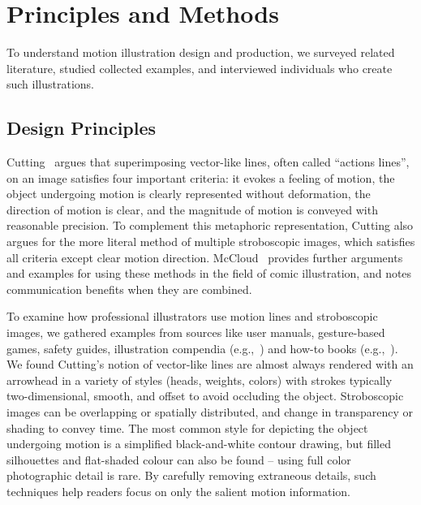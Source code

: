 
\section{Principles and Methods}
To understand motion illustration design and production, we surveyed related literature, studied collected examples, and interviewed individuals who create such illustrations.

\subsection{Design Principles}
Cutting~\cite{cutting_representing_2002} argues that superimposing vector-like lines, often called ``actions lines'', on an image satisfies four important criteria: it evokes a feeling of motion, the object undergoing motion is clearly represented without deformation, the direction of motion is clear, and the magnitude of motion is conveyed with reasonable precision. To complement this metaphoric representation, Cutting also argues for the more literal method of multiple stroboscopic images, which satisfies all criteria except clear motion direction. McCloud~\cite{mccloud_understanding_1994} provides further arguments and examples for using these methods in the field of comic illustration, and notes communication benefits when they are combined.

To examine how professional illustrators use motion lines and stroboscopic images, we gathered examples from sources like user manuals, gesture-based games, safety guides, %
illustration compendia (e.g.,~\cite{mijksenaar1999open}) and how-to books (e.g.,~\cite{greenberg2012sketching}).
%
We found Cutting's notion of vector-like lines are almost always rendered with an arrowhead %
in a variety of styles (heads, weights, colors) with strokes typically two-dimensional, smooth, and offset to avoid occluding the object.
Stroboscopic images can be overlapping or spatially distributed, and change in transparency or shading to convey time.
The most common style for depicting the object undergoing motion is a simplified black-and-white contour drawing, but filled silhouettes and flat-shaded colour can also be found -- using full color photographic detail is rare.
%
By carefully removing extraneous details, such techniques help readers focus on only the salient motion information.

